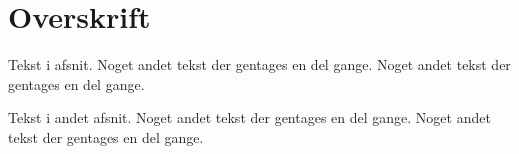 \documentclass{article}
\begin{document}
\section{Overskrift}

Tekst i afsnit.
Noget andet tekst der gentages en del gange.
Noget andet tekst der gentages en del gange.

Tekst i andet afsnit.
Noget andet tekst der gentages en del gange.
Noget andet tekst der gentages en del gange.
\end{document}
